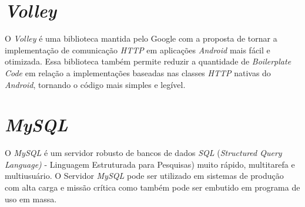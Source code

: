 \section{\textit{Volley}}
O \textit{Volley} é uma biblioteca mantida pelo Google com a proposta de tornar a implementação de comunicação\textit{ HTTP} em aplicações \textit{Android} mais fácil e otimizada. Essa biblioteca também permite reduzir a quantidade de \textit{Boilerplate Code} em relação a implementações baseadas nas classes \textit{HTTP} nativas do\textit{ Android}, tornando o código mais simples e legível. \cite{volley}

\section{\textit{MySQL}}
O \textit{MySQL} é um servidor robusto de bancos de dados \textit{SQL} (\textit{Structured Query Language)} - Linguagem Estruturada para Pesquisas) muito rápido, multitarefa e multiusuário. O Servidor \textit{MySQL} pode ser utilizado em sistemas de produção com alta carga e missão crítica como também pode ser embutido em programa de uso em massa. \cite{mysql}
